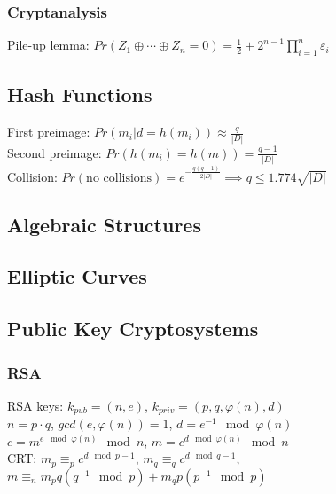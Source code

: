 \documentclass[twoside, 11pt]{article}
\begin{document}
            \subsubsection*{Cryptanalysis}
                Pile-up lemma: $Pr(Z_{1} \oplus \cdots \oplus Z_{n} = 0) = \frac{1}{2} + 2^{n-1}\prod_{i=1}^{n}\varepsilon_{i}$ \\


        \subsection*{Hash Functions}
            First preimage: $Pr(m_{i} | d=h(m_{i})) \approx \frac{q}{|D|}$ \\
            Second preimage: $Pr(h(m_{i}) = h(m)) = \frac{q-1}{|D|}$ \\
            Collision: $Pr(\text{no collisions}) = e^{-\frac{q(q-1)}{2|D|}} \implies q \leqslant 1.774\sqrt{|D|}$

        \subsection*{Algebraic Structures}

        \subsection*{Elliptic Curves}

        \subsection*{Public Key Cryptosystems}
            \subsubsection*{RSA}
                RSA keys: $k_{pub} = (n, e)$, $k_{priv}=(p, q, \varphi(n), d)$ \\
                $n=p\cdot q$, $gcd(e, \varphi(n))=1$, $d=e^{-1}\mod{\varphi(n)}$ \\
                $c=m^{e \mod{\varphi(n)}} \mod{n}$, $m=c^{d \mod{\varphi(n)}} \mod{n}$ \\
                CRT: $m_{p} \equiv_{p} c^{d \mod{p-1}}$, $m_{q} \equiv_{q} c^{d \mod{q-1}}$, $m \equiv_{n} m_{p}q(q^{-1}\mod{p}) + m_{q}p(p^{-1}\mod{p})$
\end{document}
